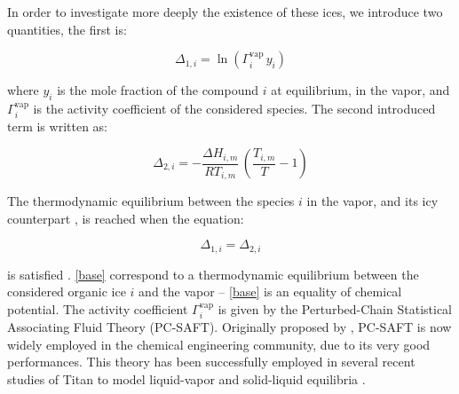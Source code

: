 \documentclass{arxiv-icarus}
\begin{document}
In order to investigate more deeply the existence of these ices, we introduce two quantities, the first is:

\begin{equation}\label{eq:delta_1}
  \Delta_{1,i} = \ln\left( \Gamma^\text{vap}_i \, y_i \right)
\end{equation}

where $y_i$ is the mole fraction of the compound $i$ at equilibrium, in the vapor, and $\Gamma^\text{vap}_i$ is the activity coefficient of the considered species. The second introduced term is written as:

\begin{equation}\label{eq:delta_2}
 \Delta_{2,i} = -\frac{\Delta H_{i,m}}{R T_{i,m}} \, \left(\frac{T_{i,m}}{T} - 1\right)
\end{equation}

The thermodynamic equilibrium between the species $i$ in the vapor, and its icy counterpart , is reached when the equation:

\begin{equation}\label{eq:base}
  \Delta_{1,i} = \Delta_{2,i}
\end{equation}

is satisfied \citep{Poling2007}. \eqref{base} correspond to a thermodynamic equilibrium between the considered organic ice $i$ and the vapor -- \eqref{base} is an equality of chemical potential.
The activity coefficient $\Gamma^\text{vap}_i$ is given by the Perturbed-Chain Statistical Associating Fluid Theory (PC-SAFT).
Originally proposed by \cite{Gross2001}, PC-SAFT is now widely employed in the chemical engineering community, due to its very good performances.
This theory has been successfully employed in several recent studies of Titan to model liquid-vapor and solid-liquid equilibria \citep{Tan2013,Luspay-Kuti2015,Tan2015,Cordier2016b,Cordier2016c}.
\end{document}
